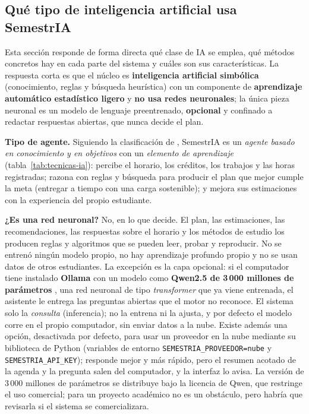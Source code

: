 \subsection{Qué tipo de inteligencia artificial usa SemestrIA}\label{sec:tipo-ia}

Esta sección responde de forma directa qué clase de IA se emplea, qué métodos concretos hay en cada parte del sistema y cuáles son sus características. La respuesta corta es que el núcleo es \textbf{inteligencia artificial simbólica} (conocimiento, reglas y búsqueda heurística) con un componente de \textbf{aprendizaje automático estadístico ligero} y \textbf{no usa redes neuronales}; la única pieza neuronal es un modelo de lenguaje preentrenado, \textbf{opcional} y confinado a redactar respuestas abiertas, que nunca decide el plan.

\textbf{Tipo de agente.} Siguiendo la clasificación de \textcite{Russell2021}, SemestrIA es un \emph{agente basado en conocimiento y en objetivos} con un \emph{elemento de aprendizaje} (tabla~\ref{tab:tecnicas-ia}): percibe el horario, los créditos, los trabajos y las horas registradas; razona con reglas y búsqueda para producir el plan que mejor cumple la meta (entregar a tiempo con una carga sostenible); y mejora sus estimaciones con la experiencia del propio estudiante.

\textbf{¿Es una red neuronal?} No, en lo que decide. El plan, las estimaciones, las recomendaciones, las respuestas sobre el horario y los métodos de estudio los producen reglas y algoritmos que se pueden leer, probar y reproducir. No se entrenó ningún modelo propio, no hay aprendizaje profundo propio y no se usan datos de otros estudiantes. La excepción es la capa opcional: si el computador tiene instalado \textbf{Ollama} \parencite{Ollama} con un modelo como \textbf{Qwen2.5 de 3\,000 millones de parámetros} \parencite{Qwen2024}, una red neuronal de tipo \emph{transformer} \parencite{Vaswani2017} que ya viene entrenada, el asistente le entrega las preguntas abiertas que el motor no reconoce. El sistema solo la \emph{consulta} (inferencia); no la entrena ni la ajusta, y por defecto el modelo corre en el propio computador, sin enviar datos a la nube. Existe además una opción, desactivada por defecto, para usar un proveedor en la nube mediante su biblioteca de Python (variables de entorno \texttt{SEMESTRIA\_PROVEEDOR=nube} y \texttt{SEMESTRIA\_API\_KEY}); responde mejor y más rápido, pero el resumen acotado de la agenda y la pregunta salen del computador, y la interfaz lo avisa. La versión de 3\,000 millones de parámetros se distribuye bajo la licencia de Qwen, que restringe el uso comercial; para un proyecto académico no es un obstáculo, pero habría que revisarla si el sistema se comercializara.

